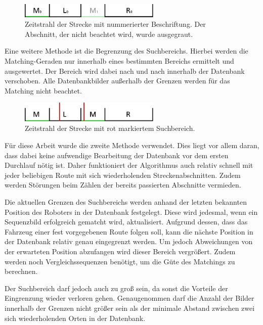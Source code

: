 \documentclass[12pt,a4paper,titlepage]{scrartcl}
\begin{document}
\begin{figure}[ht]
	\centering
	\includegraphics[width=0.6\textwidth]{../Bilder/loop_closure_erste_methode.pdf}
	\caption[Methode 1 zur Schleifenbehandlung]{Zeitstrahl der Strecke mit nummerierter Beschriftung. Der Abschnitt, der nicht beachtet wird, wurde ausgegraut.}
	\label{img:Loop_Clos_1}
\end{figure}
Eine weitere Methode ist die Begrenzung des Suchbereichs. Hierbei werden die Matching-Geraden nur innerhalb eines bestimmten Bereichs ermittelt und ausgewertet. Der Bereich wird dabei nach und nach innerhalb der Datenbank verschoben. Alle Datenbankbilder außerhalb der Grenzen werden für das Matching nicht beachtet. 

\begin{figure}[ht]
	\centering
	\includegraphics[width=0.6\textwidth]{../Bilder/loop_closure_zweite_methode.pdf}
	\caption[Methode 2 zur Schleifenbehandlung]{Zeitstrahl der Strecke mit rot markiertem Suchbereich.}
	\label{img:Loop_Clos_2}
\end{figure}
Für diese Arbeit wurde die zweite Methode verwendet. Dies liegt vor allem daran, dass dabei keine aufwendige Bearbeitung der Datenbank vor dem ersten Durchlauf nötig ist. Daher funktioniert der Algorithmus auch relativ schnell mit jeder beliebigen Route mit sich wiederholenden Streckenabschnitten. Zudem werden Störungen beim Zählen der bereits passierten Abschnitte vermieden. 

Die aktuellen Grenzen des Suchbereichs werden anhand der letzten bekannten Position des Roboters in der Datenbank festgelegt. Diese wird jedesmal, wenn ein Sequenzbild erfolgreich gematcht wird, aktualisiert. Aufgrund dessen, dass das Fahrzeug einer fest vorgegebenen Route folgen soll, kann die nächste Position in der Datenbank relativ genau eingegrenzt werden. Um jedoch Abweichungen von der erwarteten Position abzufangen wird dieser Bereich vergrößert. Zudem werden noch Vergleichssequenzen benötigt, um die Güte des Matchings zu berechnen. 

Der Suchbereich darf jedoch auch zu groß sein, da sonst die Vorteile der Eingrenzung wieder verloren gehen. Genaugenommen darf die Anzahl der Bilder innerhalb der Grenzen nicht größer sein als der minimale Abstand zwischen zwei sich wiederholenden Orten in der Datenbank. 
\end{document}
